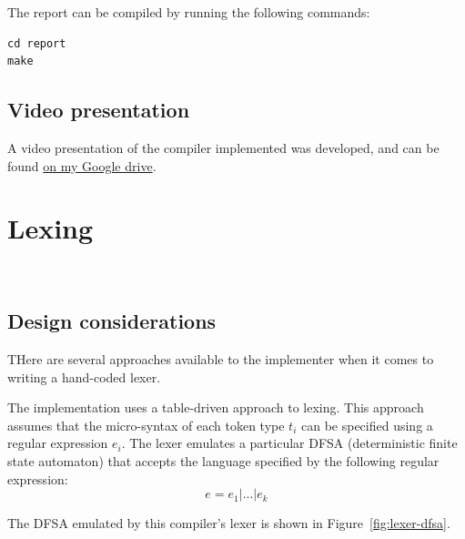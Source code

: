 \documentclass[11pt,a4paper]{scrartcl}
\begin{document}
The report can be compiled by running the following commands:
\begin{verbatim}
cd report
make
\end{verbatim}

\subsection{Video presentation}

A video presentation of the compiler implemented was developed, and can be found \href{https://drive.google.com/file/d/1YSH7jUDW-PpR4YmvCW0ssTWVA2O2pTK9/view?usp=sharing}{on my Google drive}.

\newpage

\section{Lexing}~\label{sec:lexer}

\subsection{Design considerations}

THere are several approaches available to the implementer when it comes to writing a hand-coded lexer.

The implementation uses a table-driven approach to lexing. This approach assumes that the micro-syntax of each token type $t_{i}$ can be specified using a regular expression $e_{i}$. The lexer emulates a particular DFSA (deterministic finite state automaton) that accepts the language specified by the following regular expression:
$$ e = e_{1} | ... | e_{k} $$

The DFSA emulated by this compiler's lexer is shown in Figure~\ref{fig:lexer-dfsa}.
\end{document}
